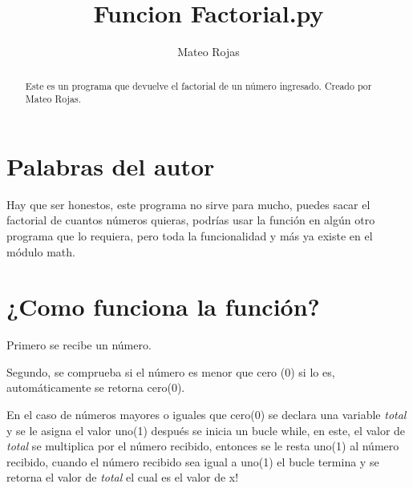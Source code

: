 \documentclass{article}
\title{Funcion Factorial.py}
\author{Mateo Rojas}
\begin{document}
\maketitle

\begin{abstract}
Este es un programa que devuelve el factorial de un número ingresado. Creado por Mateo Rojas.
\end{abstract}

\section{Palabras del autor}

Hay que ser honestos, este programa no sirve para mucho, puedes sacar el factorial de cuantos números quieras, podrías usar la función en algún otro programa que lo requiera, pero toda la funcionalidad y más ya existe en el módulo math. 

\section{¿Como funciona la función?}
Primero se recibe un número.

Segundo, se comprueba si el número es menor que cero (0) si lo es, automáticamente se retorna cero(0).

En el caso de números mayores o iguales que cero(0) se declara una variable \textit{total} y se le asigna el valor uno(1) después se inicia un bucle while, en este, el valor de \textit{total} se multiplica por el número recibido, entonces se le resta uno(1) al número recibido, cuando el número recibido sea igual a uno(1) el bucle termina y se retorna el valor de \textit{total} el cual es el valor de x!
\end{document}
